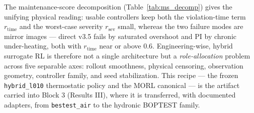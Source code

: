 \documentclass[11pt,a4paper]{article}
\begin{document}
The maintenance-score decomposition (Table~\ref{tab:ms_decomp}) gives the unifying physical reading: usable controllers keep both the violation-time term $r_{\mathrm{time}}$ and the worst-case severity $r_{\mathrm{sev}}$ small, whereas the two failure modes are mirror images --- direct v3.5 fails by saturated overshoot and PI by chronic under-heating, both with $r_{\mathrm{time}}$ near or above $0.6$. Engineering-wise, hybrid surrogate RL is therefore not a single architecture but a \emph{role-allocation} problem across five separable axes: rollout smoothness, physical censoring, observation geometry, controller family, and seed stabilization. This recipe --- the frozen \texttt{hybrid\_l010} thermostatic policy and the MORL canonical --- is the artifact carried into Block 3 (Results III), where it is transferred, with documented adapters, from \texttt{bestest\_air} to the hydronic BOPTEST family.
\end{document}

